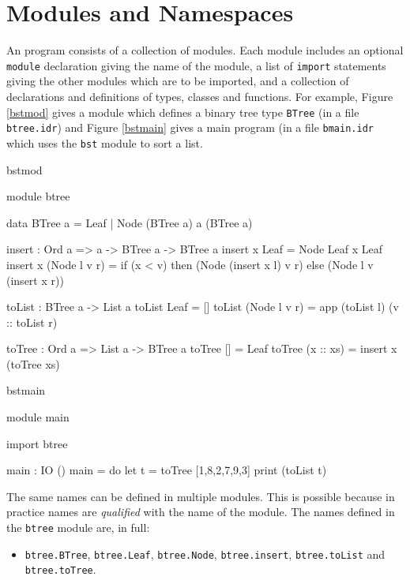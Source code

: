 \section{Modules and Namespaces}
\label{sect:namespaces}

An \Idris{} program consists of a collection of modules. Each module includes
an optional \texttt{module} declaration giving the name of the module, a
list of \texttt{import} statements giving the other modules which are to be imported,
and a collection of declarations and definitions of types, classes and functions.
For example, Figure \ref{bstmod} gives a module which defines a binary
tree type \texttt{BTree} (in a file \texttt{btree.idr}) and Figure
\ref{bstmain} gives a main program (in a file \texttt{bmain.idr} which uses the
\texttt{bst} module to sort a list.

\begin{SaveVerbatim}{bstmod}

module btree

data BTree a = Leaf
             | Node (BTree a) a (BTree a)

insert : Ord a => a -> BTree a -> BTree a
insert x Leaf = Node Leaf x Leaf
insert x (Node l v r) = if (x < v) then (Node (insert x l) v r)
                                   else (Node l v (insert x r))

toList : BTree a -> List a
toList Leaf = []
toList (Node l v r) = app (toList l) (v :: toList r)

toTree : Ord a => List a -> BTree a
toTree [] = Leaf
toTree (x :: xs) = insert x (toTree xs)

\end{SaveVerbatim}

\begin{SaveVerbatim}{bstmain}

module main

import btree

main : IO ()
main = do let t = toTree [1,8,2,7,9,3] 
          print (toList t)

\end{SaveVerbatim}

\noindent
The same names can be defined in multiple modules. This is possible because in practice names
are \emph{qualified} with the name of the module. 
The names defined in the \texttt{btree} module are, in full:

\begin{itemize}
\item \texttt{btree.BTree}, \texttt{btree.Leaf}, \texttt{btree.Node}, \texttt{btree.insert},
\texttt{btree.toList} and \texttt{btree.toTree}.
\end{itemize}

